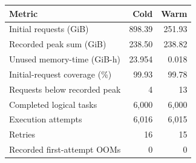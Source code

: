 \begin{tabular}{@{}lrr@{}}
\toprule
Metric & Cold & Warm\\
\midrule
Initial requests (GiB) & 898.39 & 251.93 \\
Recorded peak sum (GiB) & 238.50 & 238.82 \\
Unused memory-time (GiB-h) & 23.954 & 0.018 \\
Initial-request coverage (\%) & 99.93 & 99.78 \\
Requests below recorded peak & 4 & 13 \\
Completed logical tasks & 6,000 & 6,000 \\
Execution attempts & 6,016 & 6,015 \\
Retries & 16 & 15 \\
Recorded first-attempt OOMs & 0 & 0 \\
\bottomrule
\end{tabular}
